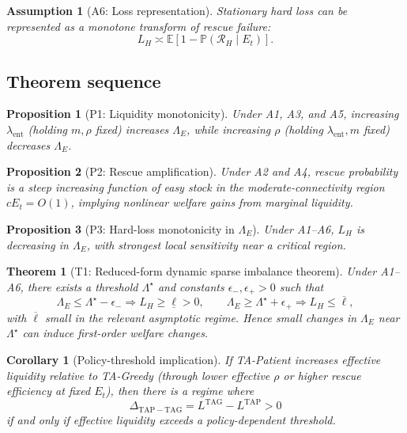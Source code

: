 \documentclass{article}
\newtheorem{assumption}{Assumption}
\newtheorem{theorem}{Theorem}
\newtheorem{proposition}{Proposition}
\newtheorem{corollary}{Corollary}
\newcommand{\EE}{\mathbb{E}}
\newcommand{\PP}{\mathbb{P}}
\begin{document}
\begin{assumption}[A6: Loss representation]
Stationary hard loss can be represented as a monotone transform of rescue failure:
\[
L_H \asymp \EE\!\left[1-\PP(\mathcal R_H\mid E_t)\right].
\]
\end{assumption}

\subsection{Theorem sequence}

\begin{proposition}[P1: Liquidity monotonicity]
Under A1, A3, and A5, increasing \(\lambda_{\mathrm{ent}}\) (holding \(m,\rho\) fixed) increases \(\Lambda_E\), while increasing \(\rho\) (holding \(\lambda_{\mathrm{ent}},m\) fixed) decreases \(\Lambda_E\).
\end{proposition}

\begin{proposition}[P2: Rescue amplification]
Under A2 and A4, rescue probability is a steep increasing function of easy stock in the moderate-connectivity region \(cE_t=O(1)\), implying nonlinear welfare gains from marginal liquidity.
\end{proposition}

\begin{proposition}[P3: Hard-loss monotonicity in \(\Lambda_E\)]
Under A1--A6, \(L_H\) is decreasing in \(\Lambda_E\), with strongest local sensitivity near a critical region.
\end{proposition}

\begin{theorem}[T1: Reduced-form dynamic sparse imbalance theorem]
Under A1--A6, there exists a threshold \(\Lambda^\star\) and constants \(\epsilon_-,\epsilon_+>0\) such that
\[
\Lambda_E\le \Lambda^\star-\epsilon_- \Rightarrow L_H\ge \underline{\ell}>0,\qquad
\Lambda_E\ge \Lambda^\star+\epsilon_+ \Rightarrow L_H\le \overline{\ell},
\]
with \(\overline{\ell}\) small in the relevant asymptotic regime. Hence small changes in \(\Lambda_E\) near \(\Lambda^\star\) can induce first-order welfare changes.
\end{theorem}

\begin{corollary}[Policy-threshold implication]
If TA-Patient increases effective liquidity relative to TA-Greedy (through lower effective \(\rho\) or higher rescue efficiency at fixed \(E_t\)), then there is a regime where
\[
\Delta_{\mathrm{TAP}-\mathrm{TAG}}=L^{\mathrm{TAG}}-L^{\mathrm{TAP}}>0
\]
if and only if effective liquidity exceeds a policy-dependent threshold.
\end{corollary}
\end{document}
